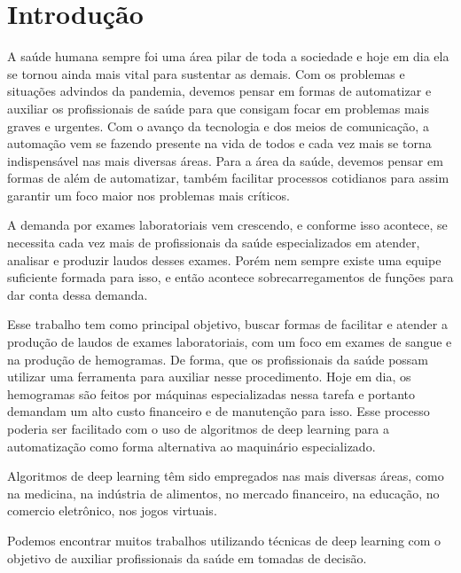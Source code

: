 \chapter{Introdução}
\label{chap:introducao}

A saúde humana sempre foi uma área pilar de toda a sociedade e hoje em dia ela se tornou ainda mais vital para sustentar as demais. Com os problemas e situações advindos da pandemia, devemos pensar em formas de automatizar e auxiliar os profissionais de saúde para que consigam focar em problemas mais graves e urgentes. Com o avanço da tecnologia e dos meios de comunicação, a automação vem se fazendo presente na vida de todos e cada vez mais se torna indispensável nas mais diversas áreas. Para a área da saúde, devemos pensar em formas de além de automatizar, também facilitar processos cotidianos para assim garantir um foco maior nos problemas mais críticos.

A demanda por exames laboratoriais vem crescendo, e conforme isso acontece, se necessita cada vez mais de profissionais da saúde especializados em atender, analisar e produzir laudos desses exames. Porém nem sempre existe uma equipe suficiente formada para isso, e então acontece sobrecarregamentos de funções para dar conta dessa demanda.

Esse trabalho tem como principal objetivo, buscar formas de facilitar e atender a produção de laudos de exames laboratoriais, com um foco em exames de sangue e na produção de hemogramas. De forma, que os profissionais da saúde possam utilizar uma ferramenta para auxiliar nesse procedimento. Hoje em dia, os hemogramas são feitos por máquinas especializadas nessa tarefa e portanto demandam um alto custo financeiro e de manutenção para isso. Esse processo poderia ser facilitado com o uso de algoritmos de deep learning para a automatização como forma alternativa ao maquinário especializado.

Algoritmos de deep learning têm sido empregados nas mais diversas áreas, como na medicina, na indústria de alimentos, no mercado financeiro, na educação, no comercio eletrônico, nos jogos virtuais.

Podemos encontrar muitos trabalhos utilizando técnicas de deep learning com o objetivo de auxiliar profissionais da saúde em tomadas de decisão.


